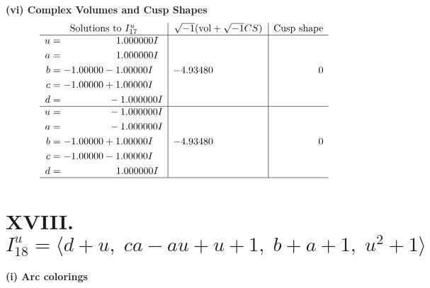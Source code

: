 \documentclass[1p]{elsarticle_modified}
\theoremstyle{definition}
\newcommand{\I}{\sqrt{-1}}
\begin{document}
\newpage\flushleft \textbf{(vi) Complex Volumes and Cusp Shapes}
$$\begin{array}{c|c|c}  
\text{Solutions to }I^u_{17}& \I (\text{vol} + \sqrt{-1}CS) & \text{Cusp shape}\\
 \hline 
\begin{aligned}
u &= \phantom{-0.000000 -}1.000000 I \\
a &= \phantom{-0.000000 -}1.000000 I \\
b &= -1.00000 - 1.00000 I \\
c &= -1.00000 + 1.00000 I \\
d &= \phantom{-0.000000 } -1.000000 I\end{aligned}
 & -4.93480\phantom{ +0.000000I} & \phantom{-0.000000 } 0 \\ \hline\begin{aligned}
u &= \phantom{-0.000000 } -1.000000 I \\
a &= \phantom{-0.000000 } -1.000000 I \\
b &= -1.00000 + 1.00000 I \\
c &= -1.00000 - 1.00000 I \\
d &= \phantom{-0.000000 -}1.000000 I\end{aligned}
 & -4.93480\phantom{ +0.000000I} & \phantom{-0.000000 } 0\\
 \hline 
 \end{array}$$\newpage\newpage\renewcommand{\arraystretch}{1}
\centering \section*{XVIII. $I^u_{18}= \langle d+u,\;c a- a u+u+1,\;b+a+1,\;u^2+1 \rangle$}
\flushleft \textbf{(i) Arc colorings}\\
\end{document}
